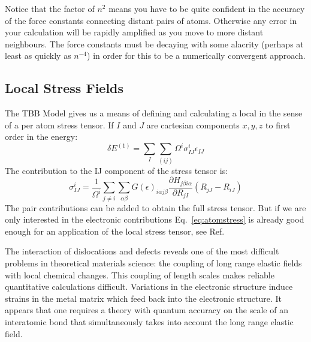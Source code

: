 Notice that the factor of $n^{2}$ means you have to be quite confident in the accuracy of
the force constants connecting distant pairs of atoms. Otherwise any error
in your calculation will be rapidly amplified as you move to more distant neighbours. 
The force constants must be decaying with some alacrity 
(perhaps at least as quickly as $n^{-4}$) in order for this to be a numerically convergent
approach.

\subsection{Local Stress Fields}
The TBB Model \cite{nielsen83, sutton88} gives us a means of defining and calculating 
a local in the sense of a per atom stress tensor. If $I$ and $J$ 
are cartesian components $x,y,z$ to first order in the energy:
%
\begin{equation}
\delta E^(1) = \sum_{I} \sum_{(ij)}\Omega^{i}\sigma^{i}_{IJ}\epsilon_{IJ}
\end{equation}
%
The contribution to the IJ component of the stress tensor is:
%
\begin{equation}
\label{eq:atomstress}
\sigma^{i}_{IJ} = \frac{1}{\Omega^{i}}\sum_{j\neq i}\sum_{\alpha\beta}G(\epsilon)_{i\alpha j\beta}\frac{\partial H_{j\beta i\alpha}}{\partial R_{jI}}(R_{jJ}-R_{iJ})
\end{equation}
%
The pair contributions can be added to obtain the full stress tensor. 
But if we are only interested in the electronic contributions
Eq.~\ref{eq:atomstress} is already good enough
for an application of the local stress tensor,
see Ref.~\cite{ohta90}


The interaction of dislocations and defects reveals one of the most difficult problems
in theoretical materials science: the coupling of long range elastic fields
with local chemical changes. This coupling of length scales makes
reliable quantitative calculations difficult. Variations in the electronic structure
induce strains in the metal matrix which feed back into the electronic structure. 
It appears that one requires a theory with quantum accuracy on the scale of an 
interatomic bond that simultaneously takes into account the long range elastic 
field.

